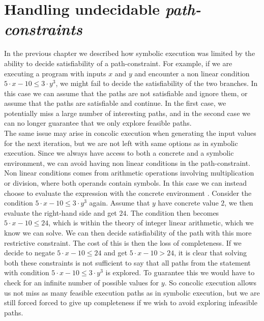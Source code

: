 \section{Handling undecidable \emph{path-constraints}} 
In the previous chapter we described how symbolic execution was limited by the ability to decide satisfiability of a path-constraint. For example, if we are executing a program with inputs $x$ and $y$ and encounter a non linear condition $ 5\cdot x - 10 \leq 3 \cdot y^3$, we might fail to decide the satisfiability of the two branches. In this case we can assume that the paths are not satisfiable and ignore them, or assume that the paths are satisfiable and continue. In the first case, we potentially miss a large number of interesting paths, and in the second case we can no longer guarantee that we only explore feasible paths.\\
The same issue may arise in concolic execution when generating the input values for the next iteration, but we are not left with same options as in symbolic execution. Since we always have access to both a concrete and a symbolic environment, we can avoid having non linear conditions in the path-constraint. Non linear conditions comes from arithmetic operations involving multiplication or division, where both operands contain symbols. In this case we can instead choose to evaluate the expression with the concrete environment \citep{Godefroid:2005:DDA:1064978.1065036}. Consider the condition $ 5\cdot x - 10 \leq 3 \cdot y^3$ again. Assume that $y$ have concrete value $2$, we then evaluate the right-hand side and get $24$. The condition then becomes $ 5\cdot x - 10 \leq 24$, which is within the theory of integer linear arithmetic, which we know we can solve. We can then decide satisfiability of the path with this more restrictive constraint. The cost of this is then the loss of completeness. If we decide to negate $5\cdot x - 10 \leq 24$ and get $5\cdot x - 10 > 24$, it is clear that solving both these constraints is not sufficient to say that all paths from the statement with condition $ 5\cdot x - 10 \leq 3 \cdot y^3$ is explored. To guarantee this we would have to check for an infinite number of possible values for $y$. So concolic execution allows us not miss as many feasible execution paths as in symbolic execution, but we are still forced forced to give up completeness if we wish to avoid exploring infeasible paths.